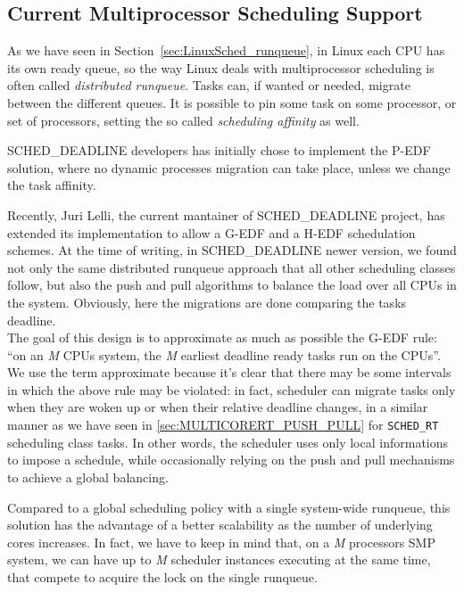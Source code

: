 \subsection{Current Multiprocessor Scheduling Support}\label{sec:schedDead_multiproc}

As we have seen in Section~\ref{sec:LinuxSched_runqueue}, in Linux
each CPU has its own ready queue, so the way Linux deals with
multiprocessor scheduling is often called \emph{distributed
  runqueue}. Tasks can, if wanted or needed, migrate between the
different queues. It is possible to pin some task on some processor,
or set of processors, setting the so called \emph{scheduling
  affinity} as well.

SCHED\_DEADLINE developers has initially chose to implement the P-EDF
solution, where no dynamic processes migration can take place, unless
we change the task
affinity.

Recently, Juri Lelli, the current mantainer of SCHED\_DEADLINE
project, has extended its implementation to allow a G-EDF and a H-EDF
schedulation schemes.  At the time of writing, in SCHED\_DEADLINE
newer version, we found not only the same distributed runqueue
approach that all other scheduling classes follow, but also the push
and pull algorithms to balance the load over all CPUs in the system.
Obviously, here the migrations are done comparing the tasks deadline.\\
The goal of this design is to approximate as much as possible the
G-EDF rule: ``on an \emph{M} CPUs system, the \emph{M} earliest
deadline ready tasks run on the CPUs''. We use the term approximate
because it's clear that there may be some intervals in which the above
rule may be violated: in fact, scheduler can migrate tasks only when
they are woken up or when their relative deadline changes, in a
similar manner as we have seen in \ref{sec:MULTICORERT_PUSH_PULL} for
\texttt{SCHED\_RT} scheduling class tasks. In other words, the
scheduler uses only local informations to impose a schedule, while
occasionally relying on the push and pull mechanisms to
achieve a global balancing.

Compared to a global scheduling policy with a single system-wide
runqueue, this solution has the advantage of a better scalability as
the number of underlying cores increases. In fact, we have to keep in
mind that, on a \emph{M} processors SMP system, we can have up to
\emph{M} scheduler instances executing at the same time,
that compete to acquire the lock on the single runqueue.

